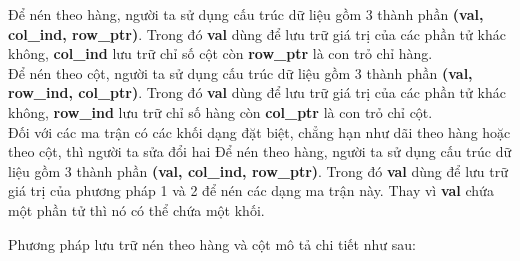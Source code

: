  Để nén theo hàng, người ta sử dụng cấu trúc dữ liệu gồm 3 thành phần {\bf (val, col\_ind, row\_ptr)}. Trong đó {\bf val} dùng để lưu trữ giá trị của các phần tử khác không, {\bf col\_ind} lưu trữ chỉ số cột còn {\bf row\_ptr} là con trỏ chỉ hàng.\\

 Để nén theo cột, người ta sử dụng cấu trúc dữ liệu gồm 3 thành phần {\bf (val, row\_ind, col\_ptr)}. Trong đó {\bf val} dùng để lưu trữ giá trị của các phần tử khác không, {\bf row\_ind} lưu trữ chỉ số hàng còn {\bf col\_ptr} là con trỏ chỉ cột.\\

 Đối với các ma trận có các khối dạng đặt biệt, chẳng hạn như dãi theo hàng hoặc theo cột, thì người ta sửa đổi hai Để nén theo hàng, người ta sử dụng cấu trúc dữ liệu gồm 3 thành phần {\bf (val, col\_ind, row\_ptr)}. Trong đó {\bf val} dùng để lưu trữ giá trị của phương pháp 1 và 2 để nén các dạng ma trận này. Thay vì {\bf val} chứa một phần tử thì nó có thể chứa một khối.

Phương pháp lưu trữ nén theo hàng và cột mô tả chi tiết như sau:

